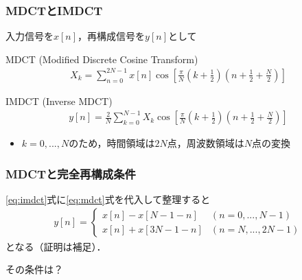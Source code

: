 \documentclass[14pt,xcolor=dvipsnames,table,dvipdfmx]{beamer}
\begin{document}
\begin{frame}[c]
    \frametitle{MDCTとIMDCT}
    入力信号を$x[n]$，再構成信号を$y[n]$として
    \begin{block}{MDCT (Modified Discrete Cosine Transform)}
        \vspace{-15pt}
        \begin{align}
            X_{k} = \sum_{n = 0}^{2N - 1} x[n] \cos\left[ \frac{\pi}{N} \left( k + \frac{1}{2} \right) \left( n + \frac{1}{2} + \frac{N}{2} \right) \right] \label{eq:mdct}
        \end{align}
    \end{block}
    \begin{block}{IMDCT (Inverse MDCT)}
        \vspace{-15pt}
        \begin{align}
            y[n] = \frac{2}{N} \sum_{k = 0}^{N - 1} X_{k} \cos\left[ \frac{\pi}{N} \left( k + \frac{1}{2} \right) \left( n + \frac{1}{2} + \frac{N}{2} \right) \right] \label{eq:imdct}
        \end{align}
    \end{block}
    \begin{itemize}
        \item $k = 0, ..., N$のため，時間領域は$2N$点，周波数領域は$N$点の変換
    \end{itemize}
\end{frame}

\begin{frame}[c]
    \frametitle{MDCTと完全再構成条件}
    \eqref{eq:imdct}式に\eqref{eq:mdct}式を代入して整理すると
    \begin{align}
        y[n] =
        \left\{ \begin{array}{ll}
            x[n] - x[N - 1 - n] & (n = 0, ..., N - 1) \\
            x[n] + x[3N - 1 - n] & (n = N, ..., 2N - 1)
        \end{array} \right. \label{eq:mdct_reconstruction}
    \end{align}
    となる（証明は補足）．
    \begin{block}{}
        その条件は？
    \end{block}
\end{frame}
\end{document}
